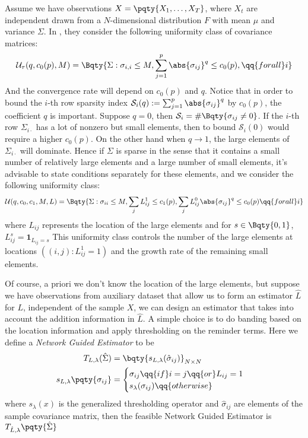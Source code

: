 Assume we have observations \(X = \pqty{X_{1}, \dots, X_{T}}\), where \(X_{t}\) are independent drawn from a \(N\)-dimensional distribution \(F\) with mean \(\mu\) and variance \(\Sigma\). In \cite{bickel2008CovarianceRegularization}, they consider the following uniformity class of covariance matrices:
\begin{equation*}
    \mathcal{U}_{\tau}(q, c_{0}(p) , M) = \Bqty{\Sigma: \sigma_{i,i} \leq M, \sum_{j=1}^{p} \abs{\sigma_{ij}}^{q} \leq c_{0}(p), \qq{for all} i}
\end{equation*}
And the convergence rate will depend on \(c_{0}(p)\) and \(q\). Notice that in order to bound the \(i\)-th row sparsity index \(\mathcal{S}_{i}(q) := \sum_{j=1}^{p} \abs{\sigma_{ij}}^{q}\) by \(c_{0}(p)\), the coefficient \(q\) is important. Suppose \(q = 0\), then \(\mathcal{S}_{i} = \#\Bqty{\sigma_{ij} \neq 0}\). If the \(i\)-th row \(\Sigma_{i\cdot}\) has a lot of nonzero but small elements, then to bound \(\mathcal{S}_{i}(0)\) would require a higher \(c_{0}(p)\). On the other hand when \(q \to 1\), the large elements of \(\Sigma_{i \cdot}\) will dominate. Hence if \(\Sigma\) is sparse in the sense that it contains a small number of relatively large elements and a large number of small elements, it's advisable to state conditions separately for these elements, and we consider the following uniformity class:
\begin{align*}
    \mathcal{U}(q, c_{0}, c_{1}, M, L) = \Bqty{\Sigma : \sigma_{ii} \leq M, \sum_{j} L_{ij}^{1} \leq c_{1}(p), \sum_{j} L_{ij}^{0}\abs{\sigma_{ij}}^{q} \leq c_{0}(p) \qq{for all} i}
\end{align*}
where \(L_{ij}\) represents the location of the large elements and for \(s \in \Bqty{0,1}\), \(L_{ij}^{s} = \mathbf{1}_{L_{ij} = s}\) This uniformity class controls the number of the large elements at locations \(((i,j): L_{ij}^{1} = 1)\) and the growth rate of the remaining small elements. 

Of course, a priori we don't know the location of the large elements, but suppose we have observations from auxiliary dataset that allow us to form an estimator \(\hat{L}\) for \(L\), independent of the sample \(X\), we can design an estimator that takes into account the addition information in \(\hat{L}\). A simple choice is to do banding based on the location information and apply thresholding on the reminder terms. Here we define a \textit{Network Guided Estimator} to be
\begin{align*}
    T_{L,\lambda}(\hat{\Sigma}) &= \bqty{s_{L, \lambda } (\hat{\sigma}_{ij})}_{N\times N}\\
    s_{L,\lambda} \pqty{\sigma_{ij}} &= 
    \begin{cases}
        \sigma_{ij} \qq{if} i = j \qq{or} L_{ij} = 1\\ 
        s_{\lambda}(\sigma_{ij}) \qq{otherwise} 
    \end{cases}
\end{align*}
where \(s_{\lambda}(x)\) is the generalized thresholding operator and \(\hat{\sigma}_{ij}\) are elements of the sample covariance matrix, then the feasible Network Guided Estimator is \(T_{\hat{L},\lambda}\pqty{\hat{\Sigma}}\)

